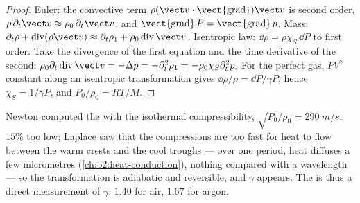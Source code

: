 \begin{proof}
Euler: the convective term $\rho(\vect v\cdot\operatorname{\vect{grad}})\vect v$
is second order, $\rho\,\partial_t\vect v \approx \rho_0\,\partial_t\vect v$, and
$\operatorname{\vect{grad}}P = \operatorname{\vect{grad}}p$. Mass: $\partial_t\rho +
\operatorname{div}(\rho\vect v) \approx \partial_t\rho_1 + \rho_0\operatorname{div}\vect v$.
Isentropic law: $\dd\rho = \rho\chi_S\,\dd P$ to first order. Take the
divergence of the first equation and the time derivative of the second:
$\rho_0\partial_t\operatorname{div}\vect v = -\Delta p = -\partial_t^2\rho_1 = -\rho_0\chi_S
\partial_t^2p$. For the perfect gas, $PV^\gamma$ constant along an isentropic
transformation gives $\dd\rho/\rho = \dd P/\gamma P$, hence $\chi_S = 1/\gamma P$,
and $P_0/\rho_0 = RT/M$.
\end{proof}

\begin{remark}\label{rem:b2:sound-waves:laplace}
Newton computed the  with the isothermal compressibility,
$\sqrt{P_0/\rho_0} = \qty{290}{m/s}$, $15\%$ too low; Laplace saw that the
compressions are too fast for heat to flow between the warm crests and
the cool troughs --- over one period, heat diffuses a few micrometres
(\cref{ch:b2:heat-conduction}), nothing compared with a wavelength ---
so the transformation is adiabatic and reversible, and $\gamma$ appears.
The  is thus a direct measurement of $\gamma$: $1.40$ for
air, $1.67$ for argon.
\end{remark}


